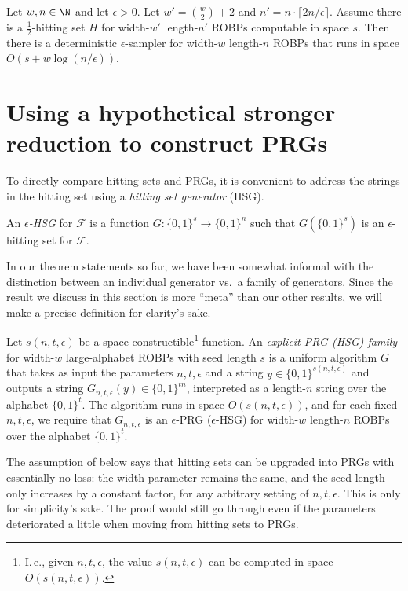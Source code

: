 \begin{corollary} \label{cor:const-width-main-generalization}
Let $w, n \in \N$ and let $\epsilon > 0$. Let $w' = \binom{w}{2} + 2$ and $n' = n \cdot \lceil 2n / \epsilon \rceil$. Assume there is a $\frac{1}{2}$-hitting set $H$ for width-$w'$ length-$n'$ ROBPs computable in space $s$. Then there is a deterministic $\epsilon$-sampler for width-$w$ length-$n$ ROBPs that runs in space $O(s + w \log(n/\epsilon))$.
\end{corollary}

\section{Using a hypothetical stronger reduction to construct PRGs} \label{sec:negative}

To directly compare hitting sets and PRGs, it is convenient to address the strings in the hitting set using a \emph{hitting set generator} (HSG).

\begin{definition}
An \emph{$\epsilon$-HSG} for $\mathcal{F}$ is a function $G \colon \{0, 1\}^s \to \{0, 1\}^n$ such that $G(\{0, 1\}^s)$ is an $\epsilon$-hitting set for $\mathcal{F}$.
\end{definition}

In our theorem statements so far, we have been somewhat informal with the distinction between an individual generator vs.\ a family of generators. Since the result we discuss in this section is more ``meta'' than our other results, we will make a precise definition for clarity's sake.

\begin{definition}
Let $s(n, t, \epsilon)$ be a space-constructible\footnote{I.\,e., given $n, t, \epsilon$, the value $s(n, t, \epsilon)$ can be computed in space $O(s(n, t, \epsilon))$.} function. An \emph{explicit PRG (HSG) family} for width-$w$ large-alphabet ROBPs with seed length $s$ is a uniform algorithm $G$ that takes as input the parameters $n, t, \epsilon$ and a string $y \in \{0, 1\}^{s(n, t, \epsilon)}$ and outputs a string $G_{n, t, \epsilon}(y) \in \{0, 1\}^{tn}$, interpreted as a length-$n$ string over the alphabet $\{0, 1\}^t$. The algorithm runs in space $O(s(n, t, \epsilon))$, and for each fixed $n, t, \epsilon$, we require that $G_{n, t, \epsilon}$ is an $\epsilon$-PRG ($\epsilon$-HSG) for width-$w$ length-$n$ ROBPs over the alphabet $\{0, 1\}^t$.
\end{definition}

The assumption of  below says that hitting sets can be upgraded into PRGs with essentially no loss: the width parameter remains the same, and the seed length only increases by a constant factor, for any arbitrary setting of $n, t, \epsilon$. This is only for simplicity's sake. The proof would still go through even if the parameters deteriorated a little when moving from hitting sets to PRGs.

